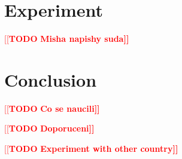 \documentclass[12pt,a4paper,english]{article}
\newcommand{\todo}[1]{\textcolor{red}{[[\textbf{TODO} \textbf{#1]]}}}
\begin{document}
    \section{Experiment}
    
    \todo{Misha napishy suda}

    \section{Conclusion}
    \todo{Co se naucili}
    
    \todo{Doporuceni}

    \todo{Experiment with other country}

    \clearpage
	
	
\end{document}
